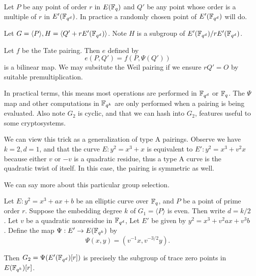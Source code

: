 Let $P$ be any point of order $r$ in $E(\mathbb{F}_q)$ and
$Q'$ be any point whose order is a multiple of $r$ in $E'(\mathbb{F}_{q^d})$.
In practice a randomly chosen point of $E'(\mathbb{F}_{q^d})$ will do.

Let $G = \langle P \rangle, H = \langle Q' + r E'(\mathbb{F}_{q^d}) \rangle$.
Note $H$ is a subgroup of $E'(\mathbb{F}_{q^d}) / rE'(\mathbb{F}_{q^d})$.

Let $f$ be the Tate pairing.
Then $e$ defined by
\[e(P,Q') = f(P, \Psi(Q')) \]
is a bilinear map.
We may subsitute the Weil pairing if we ensure
$r Q' = O$ by suitable premultiplication.

In practical terms, this means most operations are performed in
$\mathbb{F}_{q^d}$  or $\mathbb{F}_q$. The $\Psi$ map and
other computations in $\mathbb{F}_{q^k}$ are only performed
when a pairing is being evaluated.
Also note $G_2$ is cyclic, and that we can hash into $G_2$, features
useful to some cryptosystems.

We can view this trick as a
generalization of type A pairings.
Observe we have $k =2 , d = 1$, and
that the curve $E : y^2 = x^3 + x$ is equivalent to $E' : y^2 = x^3 + v^2 x$
because either $v$ or $-v$ is a quadratic residue, thus a type A curve is the
quadratic twist of itself. In this case, the pairing
is symmetric as well.

We can say more about this particular group selection.

\begin{theorem}
Let $E : y^2 = x^3 + a x + b$ be an elliptic curve over $\mathbb{F}_q$,
and $P$ be a point of prime order $r$.
Suppose the embedding degree $k$ of $G_1 = \langle P \rangle$ is even.
Then write $d = k / 2$. Let $v$ be a quadratic nonresidue in $\mathbb{F}_{q^d}$,
Let $E'$ be given by $y^2 = x^3 + v^2 a x + v^3 b$.
Define the map $\Psi:E'\rightarrow E(\mathbb{F}_{q^k})$ by
\[ \Psi(x,y) = (v^{-1}x, v^{-3/2}y) . \]

Then $G_2 = \Psi(E'(\mathbb{F}_{q^d})[r])$ is precisely the subgroup of trace zero points
in $E(\mathbb{F}_{q^k})[r]$.
\end{theorem}

